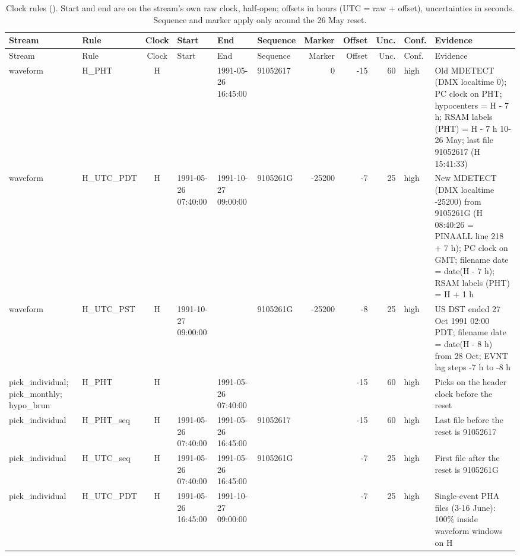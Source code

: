 \begin{landscape}
{\scriptsize
\setlength{\tabcolsep}{3pt}
\begin{longtable}{>{\raggedright}p{2.7cm}>{\raggedright}p{2.6cm}c>{\raggedright}p{1.6cm}>{\raggedright}p{1.6cm}>{\raggedright}p{2.9cm}rrrl>{\raggedright\arraybackslash}p{5.5cm}}
\caption{Clock rules (). Start and end are on the stream's own raw clock, half-open; offsets in hours (UTC = raw + offset), uncertainties in seconds. Sequence and marker apply only around the 26 May reset.}\label{tab:clockrules}\\
\toprule
Stream & Rule & Clock & Start & End & Sequence & Marker & Offset & Unc. & Conf. & Evidence\\
\midrule\endfirsthead
\toprule
Stream & Rule & Clock & Start & End & Sequence & Marker & Offset & Unc. & Conf. & Evidence\\
\midrule\endhead
\bottomrule\endfoot
waveform & H\_\allowbreak{}PHT & H &  & 1991-05-26 16:45:00 & 91052617 & 0 & -15 & 60 & high & Old MDETECT (DMX localtime 0); PC clock on PHT; hypocenters = H - 7 h; RSAM labels (PHT) = H - 7 h 10-26 May; last file 91052617 (H 15:41:33)\\
waveform & H\_\allowbreak{}UTC\_\allowbreak{}PDT & H & 1991-05-26 07:40:00 & 1991-10-27 09:00:00 & 9105261G & -25200 & -7 & 25 & high & New MDETECT (DMX localtime -25200) from 9105261G (H 08:40:26 = PINAALL line 218 + 7 h); PC clock on GMT; filename date = date(H - 7 h); RSAM labels (PHT) = H + 1 h\\
waveform & H\_\allowbreak{}UTC\_\allowbreak{}PST & H & 1991-10-27 09:00:00 &  & 9105261G & -25200 & -8 & 25 & high & US DST ended 27 Oct 1991 02:00 PDT; filename date = date(H - 8 h) from 28 Oct; EVNT lag steps -7 h to -8 h\\
pick\_individual; pick\_monthly; hypo\_brun & H\_\allowbreak{}PHT & H &  & 1991-05-26 07:40:00 &  &  & -15 & 60 & high & Picks on the header clock before the reset\\
pick\_individual & H\_\allowbreak{}PHT\_\allowbreak{}seq & H & 1991-05-26 07:40:00 & 1991-05-26 16:45:00 & 91052617 &  & -15 & 60 & high & Last file before the reset is 91052617\\
pick\_individual & H\_\allowbreak{}UTC\_\allowbreak{}seq & H & 1991-05-26 07:40:00 & 1991-05-26 16:45:00 & 9105261G &  & -7 & 25 & high & First file after the reset is 9105261G\\
pick\_individual & H\_\allowbreak{}UTC\_\allowbreak{}PDT & H & 1991-05-26 16:45:00 & 1991-10-27 09:00:00 &  &  & -7 & 25 & high & Single-event PHA files (3-16 June): 100\% inside waveform windows on H\\

\end{longtable}}
\end{landscape}
